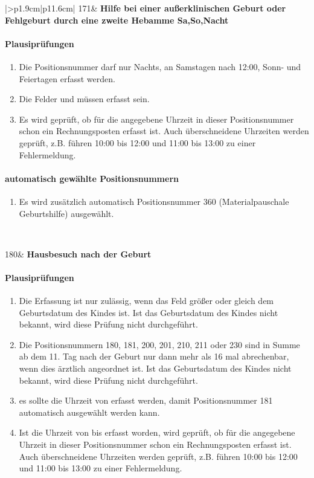 \begin{mpsupertabular}{|>{\centering}p{1.9cm}|p{11.6cm}|}
171&
\textbf{Hilfe bei einer außerklinischen Geburt oder Fehlgeburt durch eine
zweite Hebamme Sa,So,Nacht}
\paragraph{Plausiprüfungen}
\begin{enumerate}
\item
Die Positionsnummer darf nur Nachts, an Samstagen nach 12:00, 
Sonn- und Feiertagen erfasst werden.
\item
Die Felder  und  müssen erfasst sein.
\item
Es wird geprüft, ob für die angegebene Uhrzeit in dieser Positionsnummer
schon ein Rechnungsposten erfasst ist. Auch überschneidene Uhrzeiten
werden geprüft, z.B. führen 10:00 bis 12:00 und 11:00 bis 13:00 zu einer
Fehlermeldung.
\end{enumerate}
\paragraph{automatisch gewählte Positionsnummern}
\begin{enumerate}
\item
Es wird zusätzlich automatisch Positionsnummer 360 (Materialpauschale 
Geburtshilfe) ausgewählt.
\end{enumerate}
\\ \hline



180&
\textbf{Hausbesuch nach der Geburt}
\paragraph{Plausiprüfungen}
\begin{enumerate}
\item
Die Erfassung ist nur zulässig, wenn das Feld  größer 
oder gleich dem Geburtsdatum des Kindes ist. Ist das Geburtsdatum des
Kindes nicht bekannt, wird diese Prüfung nicht durchgeführt.
\item
Die Positionsnummern 180, 181, 200, 201, 210, 211 oder 230 sind in Summe 
ab dem 11. Tag nach der Geburt nur dann mehr 
als 16 mal abrechenbar, wenn dies ärztlich angeordnet ist.
Ist das Geburtsdatum des
Kindes nicht bekannt, wird diese Prüfung nicht durchgeführt.
\item
es sollte die Uhrzeit von erfasst werden, damit Positionsnummer 181 
automatisch ausgewählt werden kann.
\item
Ist die Uhrzeit von bis erfasst worden, wird geprüft, ob für die angegebene 
Uhrzeit in dieser Positionsnummer
schon ein Rechnungsposten erfasst ist. Auch überschneidene Uhrzeiten
werden geprüft, z.B. führen 10:00 bis 12:00 und 11:00 bis 13:00 zu einer
Fehlermeldung.
\end{enumerate}

\end{mpsupertabular}
